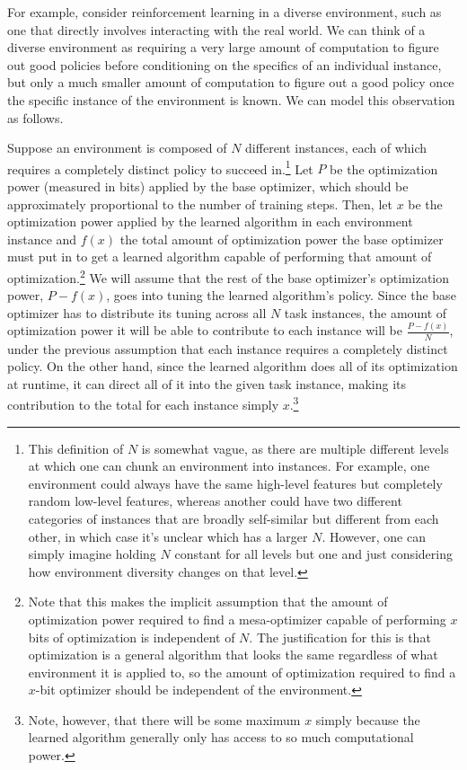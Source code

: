 \documentclass[
  onecolumn,
  natbib,
]{miri-tech-article}
\begin{document}
For example, consider reinforcement learning in a diverse environment, such as one that directly involves interacting with the real world. We can think of a diverse environment as requiring a very large amount of computation to figure out good policies before conditioning on the specifics of an individual instance, but only a much smaller amount of computation to figure out a good policy once the specific instance of the environment is known. We can model this observation as follows.

Suppose an environment is composed of $N$ different instances, each of which requires a completely distinct policy to succeed in.\footnote{This definition of $N$ is somewhat vague, as there are multiple different levels at which one can chunk an environment into instances. For example, one environment could always have the same high-level features but completely random low-level features, whereas another could have two different categories of instances that are broadly self-similar but different from each other, in which case it's unclear which has a larger $N$. However, one can simply imagine holding $N$ constant for all levels but one and just considering how environment diversity changes on that level.} Let $P$ be the optimization power (measured in bits\cite{optpow}) applied by the base optimizer, which should be approximately proportional to the number of training steps. Then, let $x$ be the optimization power applied by the learned algorithm in each environment instance and $f(x)$ the total amount of optimization power the base optimizer must put in to get a learned algorithm capable of performing that amount of optimization.\footnote{Note that this makes the implicit assumption that the amount of optimization power required to find a mesa-optimizer capable of performing $x$ bits of optimization is independent of $N$. The justification for this is that optimization is a general algorithm that looks the same regardless of what environment it is applied to, so the amount of optimization required to find a $x$-bit optimizer should be independent of the environment.} We will assume that the rest of the base optimizer's optimization power, $P - f(x)$, goes into tuning the learned algorithm's policy. Since the base optimizer has to distribute its tuning across all $N$ task instances, the amount of optimization power it will be able to contribute to each instance will be $\frac{P - f(x)}{N}$, under the previous assumption that each instance requires a completely distinct policy. On the other hand, since the learned algorithm does all of its optimization at runtime, it can direct all of it into the given task instance, making its contribution to the total for each instance simply $x$.\footnote{Note, however, that there will be some maximum $x$ simply because the learned algorithm generally only has access to so much computational power.}
\end{document}
